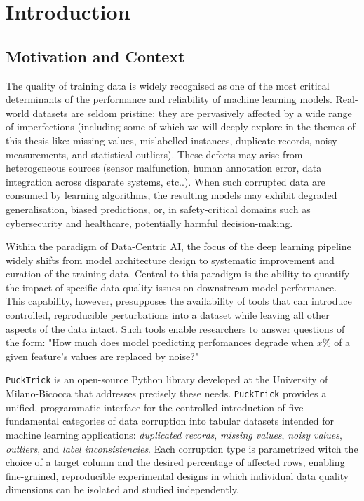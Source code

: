 \documentclass[../main.tex]{subfiles}
\begin{document}
\chapter{Introduction}
\label{chap:intro}

\section{Motivation and Context}
\label{sec:motivation}

The quality of training data is widely recognised as one of the most critical determinants of the performance and reliability of machine learning models.  Real-world datasets are seldom pristine: they are pervasively affected by a wide range of imperfections (including some of which we will deeply explore in the themes of this thesis like: missing values, mislabelled instances, duplicate records, noisy measurements, and statistical outliers).  These defects may arise from heterogeneous sources (sensor malfunction, human annotation error, data integration across disparate systems, etc..).  When such corrupted data are consumed by learning algorithms, the resulting models may exhibit degraded generalisation, biased predictions, or, in safety-critical domains such as cybersecurity and healthcare, potentially harmful decision-making.

Within the paradigm of Data-Centric AI, the focus of the deep learning pipeline widely shifts from model architecture design to systematic improvement and curation of the training data.  Central to this paradigm is the ability to quantify the impact of specific data quality issues on downstream model performance.  This capability, however, presupposes the availability of tools that can introduce controlled, reproducible perturbations into a dataset while leaving all other aspects of the data intact.
Such tools enable researchers to answer questions of the form: "How much does model predicting perfomances degrade when $x$\% of a given feature's values are replaced by noise?"

\texttt{PuckTrick}\supercite{pucktrick_docs} is an open-source Python library developed at the University of Milano-Bicocca that addresses precisely these needs. \texttt{PuckTrick} provides a unified, programmatic interface for the controlled introduction of five fundamental categories of data corruption into tabular datasets intended for machine learning applications: \emph{duplicated records}, \emph{missing values}, \emph{noisy values}, \emph{outliers}, and \emph{label inconsistencies}.  Each corruption type is parametrized witch the choice of a target column and the desired percentage of affected rows, enabling fine-grained, reproducible experimental designs in which individual data quality dimensions can be isolated and studied independently.
\end{document}

